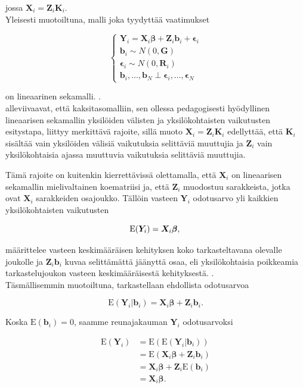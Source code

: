\documentclass[finnish]{docopts}
\begin{document}
jossa $\bm{X}_i = \bm{Z}_i \bm{K}_i$. \\

Yleisesti muotoiltuna, malli joka tyydyttää vaatimukset

$$
\left\{
    \begin{array}{ll}
        \bm{Y}_i = \bm{X}_i \bm{\beta} + \bm{Z}_i \bm{b}_i + \bm{\epsilon}_i \\
        \bm{b}_i \sim N(0,\bm{G}) \\
        \bm{\epsilon}_i \sim N(0,\bm{R}_i) \\
        \bm{b}_i, \dots , \bm{b}_N \perp \bm{\epsilon}_i, \dots , \bm{\epsilon}_N 
    \end{array}
\right.
$$

on lineaarinen sekamalli. \citep{verbeke00, laird82}.\\


\cite{fitzmaurice11} alleviivaavat, että kaksitasomalliin, sen ollessa pedagogisesti hyödyllinen lineaarisen sekamallin yksilöiden välisten ja yksilökohtaisten vaikutusten esitystapa, liittyy merkittävä rajoite, sillä muoto  $\bm{X}_i = \bm{Z}_i \bm{K}_i$ edellyttää, että $\bm{K}_i$ sisältää vain yksilöiden välisiä vaikutuksia selittäviä muuttujia ja $\bm{Z}_i$ vain yksilökohtaisia ajassa muuttuvia vaikutuksia selittäviä muuttujia.

Tämä rajoite on kuitenkin kierrettävissä olettamalla, että $\bm{X}_i$ on lineaarisen sekamallin mielivaltainen koematriisi ja, että $\bm{Z}_i$ muodostuu sarakkeista, jotka ovat $\bm{X}_i$ sarakkeiden osajoukko. Tällöin vasteen $\bm{Y}_i$ odotusarvo yli kaikkien yksilökohtaisten vaikutusten

$$
\text{E}(\bm{Y}_i) = \bm{X}_i \bm{\beta}, \\
$$

määrittelee vasteen keskimääräisen kehityksen koko tarkasteltavana olevalle joukolle ja $\bm{Z}_i \bm{b}_i$ kuvaa selittämättä jäänyttä osaa, eli yksilökohtaisia poikkeamia tarkastelujoukon vasteen keskimääräisestä kehityksestä. \citep{fitzmaurice11}. \\

Täsmällisemmin muotoiltuna, tarkastellaan ehdollista odotusarvoa

$$
\text{E}(\bm{Y}_i | \bm{b}_i) = \bm{X}_i \bm{\beta} + \bm{Z}_i \bm{b}_i.
$$

Koska $\text{E}(\bm{b}_i) = 0$, saamme reunajakauman $\bm{Y}_i$ odotusarvoksi

$$
\begin{aligned}
\text{E}(\bm{Y}_i) &=  \text{E}(\text{E}(\bm{Y}_i | \bm{b}_i)) \\
&=  \text{E}(\bm{X}_i \bm{\beta} + \bm{Z}_i \bm{b}_i) \\
&=  \bm{X}_i \bm{\beta} + \bm{Z}_i \text{E}(\bm{b}_i) \\
&=  \bm{X}_i \bm{\beta}. \\
\end{aligned}
$$
\end{document}
